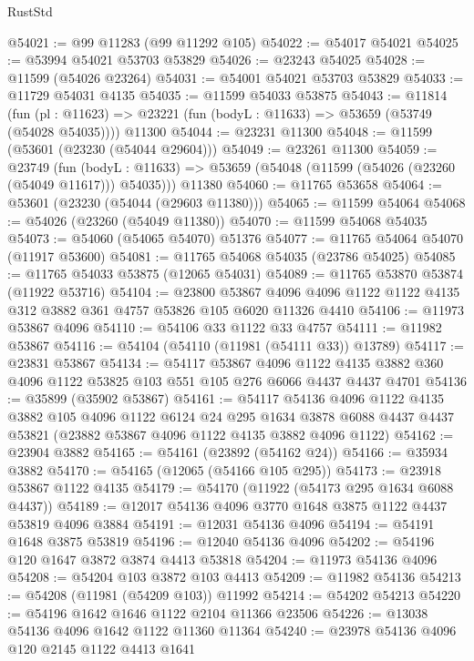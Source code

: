 \begin{lexlean}{RustStd}
\begin{coremodule}
@54021 := @99 @11283 (@99 @11292 @105)
@54022 := @54017 @54021
@54025 := @53994 @54021 @53703 @53829
@54026 := @23243 @54025
@54028 := @11599 (@54026 @23264)
@54031 := @54001 @54021 @53703 @53829
@54033 := @11729 @54031 @4135
@54035 := @11599 @54033 @53875
@54043 := @11814
    (fun (pl : @11623) => @23221 (fun (bodyL : @11633) => @53659 (@53749 (@54028 @54035))))
    @11300
@54044 := @23231 @11300
@54048 := @11599 (@53601 (@23230 (@54044 @29604)))
@54049 := @23261 @11300
@54059 := @23749
    (fun (bodyL : @11633) => @53659 (@54048 (@11599 (@54026 (@23260 (@54049 @11617))) @54035)))
    @11380
@54060 := @11765 @53658
@54064 := @53601 (@23230 (@54044 (@29603 @11380)))
@54065 := @11599 @54064
@54068 := @54026 (@23260 (@54049 @11380))
@54070 := @11599 @54068 @54035
@54073 := @54060 (@54065 @54070) @51376
@54077 := @11765 @54064 @54070 (@11917 @53600)
@54081 := @11765 @54068 @54035 (@23786 @54025)
@54085 := @11765 @54033 @53875 (@12065 @54031)
@54089 := @11765 @53870 @53874 (@11922 @53716)
@54104 := @23800
    @53867
    @4096
    @4096
    @1122
    @1122
    @4135
    @312
    @3882
    @361
    @4757
    @53826
    @105
    @6020
    @11326
    @4410
@54106 := @11973 @53867 @4096
@54110 := @54106 @33 @1122 @33 @4757
@54111 := @11982 @53867
@54116 := @54104 (@54110 (@11981 (@54111 @33)) @13789)
@54117 := @23831 @53867
@54134 := @54117
    @53867
    @4096
    @1122
    @4135
    @3882
    @360
    @4096
    @1122
    @53825
    @103
    @551
    @105
    @276
    @6066
    @4437
    @4437
    @4701
@54136 := @35899 (@35902 @53867)
@54161 := @54117
    @54136
    @4096
    @1122
    @4135
    @3882
    @105
    @4096
    @1122
    @6124
    @24
    @295
    @1634
    @3878
    @6088
    @4437
    @4437
    @53821
    (@23882 @53867 @4096 @1122 @4135 @3882 @4096 @1122)
@54162 := @23904 @3882
@54165 := @54161 (@23892 (@54162 @24))
@54166 := @35934 @3882
@54170 := @54165 (@12065 (@54166 @105 @295))
@54173 := @23918 @53867 @1122 @4135
@54179 := @54170 (@11922 (@54173 @295 @1634 @6088 @4437))
@54189 := @12017 @54136 @4096 @3770 @1648 @3875 @1122 @4437 @53819 @4096 @3884
@54191 := @12031 @54136 @4096
@54194 := @54191 @1648 @3875 @53819
@54196 := @12040 @54136 @4096
@54202 := @54196 @120 @1647 @3872 @3874 @4413 @53818
@54204 := @11973 @54136 @4096
@54208 := @54204 @103 @3872 @103 @4413
@54209 := @11982 @54136
@54213 := @54208 (@11981 (@54209 @103)) @11992
@54214 := @54202 @54213
@54220 := @54196 @1642 @1646 @1122 @2104 @11366 @23506
@54226 := @13038 @54136 @4096 @1642 @1122 @11360 @11364
@54240 := @23978
    @54136
    @4096
    @120
    @2145
    @1122
    @4413
    @1641

\end{coremodule}
\end{lexlean}
